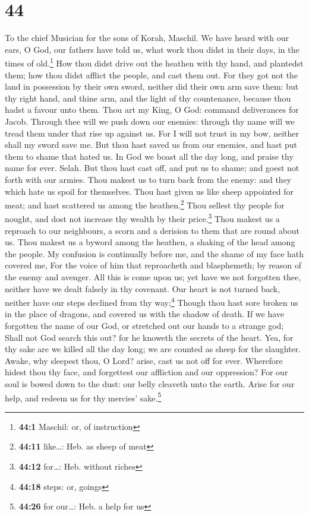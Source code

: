 \hypertarget{section-43}{%
\section{44}\label{section-43}}

To the chief Musician for the sons of Korah, Maschil.  We
have heard with our ears, O God, our fathers have told us, what work
thou didst in their days, in the times of old.\footnote{\textbf{44:1}
  Maschil: or, of instruction}  How thou didst drive out
the heathen with thy hand, and plantedst them; how thou didst afflict
the people, and cast them out.  For they got not the land
in possession by their own sword, neither did their own arm save them:
but thy right hand, and thine arm, and the light of thy countenance,
because thou hadst a favour unto them.  Thou art my King,
O God: command deliverances for Jacob.  Through thee will
we push down our enemies: through thy name will we tread them under that
rise up against us.  For I will not trust in my bow,
neither shall my sword save me.  But thou hast saved us
from our enemies, and hast put them to shame that hated us.
 In God we boast all the day long, and praise thy name for
ever. Selah.  But thou hast cast off, and put us to shame;
and goest not forth with our armies.  Thou makest us to
turn back from the enemy: and they which hate us spoil for themselves.
 Thou hast given us like sheep appointed for meat; and
hast scattered us among the heathen.\footnote{\textbf{44:11} like\ldots:
  Heb. as sheep of meat}  Thou sellest thy people for
nought, and dost not increase thy wealth by their price.\footnote{\textbf{44:12}
  for\ldots: Heb. without riches}  Thou makest us a
reproach to our neighbours, a scorn and a derision to them that are
round about us.  Thou makest us a byword among the
heathen, a shaking of the head among the people.  My
confusion is continually before me, and the shame of my face hath
covered me,  For the voice of him that reproacheth and
blasphemeth; by reason of the enemy and avenger.  All
this is come upon us; yet have we not forgotten thee, neither have we
dealt falsely in thy covenant.  Our heart is not turned
back, neither have our steps declined from thy way;\footnote{\textbf{44:18}
  steps: or, goings}  Though thou hast sore broken us in
the place of dragons, and covered us with the shadow of death.
 If we have forgotten the name of our God, or stretched
out our hands to a strange god;  Shall not God search
this out? for he knoweth the secrets of the heart.  Yea,
for thy sake are we killed all the day long; we are counted as sheep for
the slaughter.  Awake, why sleepest thou, O Lord? arise,
cast us not off for ever.  Wherefore hidest thou thy
face, and forgettest our affliction and our oppression? 
For our soul is bowed down to the dust: our belly cleaveth unto the
earth.  Arise for our help, and redeem us for thy
mercies' sake.\footnote{\textbf{44:26} for our\ldots: Heb. a help for us}

